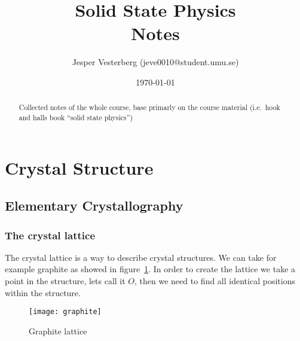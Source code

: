 \documentclass[11pt]{article}
\title{Solid State Physics \\ Notes}
\author{Jesper Vesterberg (jeve0010@student.umu.se)}
\date{\today}
\begin{document}
\begin{titlepage}
  \maketitle
  \thispagestyle{fancy}
  \rhead{\today}
  \begin{abstract}
		Collected notes of the whole course, base primarly on the course material (i.e.\ hook and halls book ``solid state physics'')
  \end{abstract}
\end{titlepage}
\lhead{\theauthor}
\rhead{\thetitle\\\today}
\cfoot{\thepage}

\tableofcontents
\newpage

\section{Crystal Structure}
\subsection{Elementary Crystallography}
\subsubsection{The crystal lattice}
The crystal lattice is a way to describe crystal structures. We can take for example graphite as showed in figure~\ref{fig:graphite}. In order to create the lattice we take a point in the structure, lets call it $O$, then we need to find all identical positions within the structure.

\begin{figure}[H]
	\centering
	\texttt{[image: graphite]}
	\caption{Graphite lattice}
	\label{fig:graphite}
\end{figure}
\end{document}

